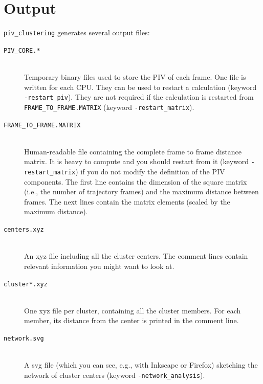 \documentclass[a4paper,11pt]{article}
\begin{document}
\section{Output}
  \texttt{piv\_clustering} generates several output files:
  \begin{description}
  \item[\texttt{PIV\_CORE.*}]\hfill\\
                                                            Temporary binary files used to store the PIV of each
                                                            frame. One file is written for each CPU. They can be used to
                                                            restart a calculation (keyword \texttt{-restart\_piv}).
                                                            They are not required if the calculation is restarted from
                                                            \texttt{FRAME\_TO\_FRAME.MATRIX} (keyword \texttt{-restart\_matrix}).
  \item[\texttt{FRAME\_TO\_FRAME.MATRIX}         ]\hfill\\
                                                            Human-readable file containing the complete frame to frame distance matrix. 
                                                            It is heavy to compute and you should restart from it 
                                                            (keyword \texttt{-restart\_matrix}) 
                                                            if you do not modify the definition of the PIV components. 
                                                            The first line contains the dimension of the square matrix (i.e., the number of 
                                                            trajectory frames) and the maximum distance between frames.
                                                            The next lines contain the matrix elements (scaled by the maximum distance).
  \item[\texttt{centers.xyz}                     ]\hfill\\
                                                            An xyz file including all the cluster centers. The comment lines 
                                                            contain relevant information you might want to look at.
  \item[\texttt{cluster*.xyz}                    ]\hfill\\
                                                            One xyz file per cluster, containing all the cluster members. 
                                                            For each member, its distance from the center is printed in the comment line.
  \item[\texttt{network.svg}                     ]\hfill\\
                                                            A svg file (which you can see, e.g.,  with Inkscape or Firefox) sketching
                                                            the network of cluster centers (keyword \texttt{-network\_analysis}).
  \end{description}
\end{document}
